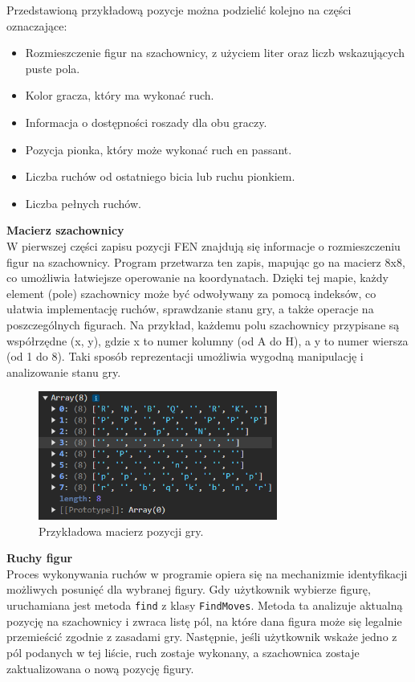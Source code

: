 \documentclass[twoside]{projektInzynierskiMS1}
\begin{document}
\newpage

\noindent
Przedstawioną przykładową pozycje można podzielić kolejno na części oznaczające:

\begin{itemize}
    \item Rozmieszczenie figur na szachownicy, z użyciem liter oraz liczb wskazujących puste pola.
    \item Kolor gracza, który ma wykonać ruch.
    \item Informacja o dostępności roszady dla obu graczy.
    \item Pozycja pionka, który może wykonać ruch en passant.
    \item Liczba ruchów od ostatniego bicia lub ruchu pionkiem.
    \item Liczba pełnych ruchów.
\end{itemize}

\noindent \textbf{Macierz szachownicy}\\
W pierwszej części zapisu pozycji FEN znajdują się informacje o rozmieszczeniu figur na szachownicy. Program przetwarza ten zapis, mapując go na macierz 8x8, co umożliwia łatwiejsze operowanie na koordynatach. Dzięki tej mapie, każdy element (pole) szachownicy może być odwoływany za pomocą indeksów, co ułatwia implementację ruchów, sprawdzanie stanu gry, a także operacje na poszczególnych figurach. Na przykład, każdemu polu szachownicy przypisane są współrzędne (x, y), gdzie x to numer kolumny (od A do H), a y to numer wiersza (od 1 do 8). Taki sposób reprezentacji umożliwia wygodną manipulację i analizowanie stanu gry.

\vspace{0.5cm}
\begin{figure}[h!]
    \centering
    \includegraphics[width=0.7\textwidth]{images/ex_matrix.png}
    \caption{Przykładowa macierz pozycji gry.}
\end{figure}

\newpage

\noindent \textbf{Ruchy figur}\\
Proces wykonywania ruchów w programie opiera się na mechanizmie identyfikacji możliwych posunięć dla wybranej figury. Gdy użytkownik wybierze figurę, uruchamiana jest metoda \texttt{find} z klasy \texttt{FindMoves}. Metoda ta analizuje aktualną pozycję na szachownicy i zwraca listę pól, na które dana figura może się legalnie przemieścić zgodnie z zasadami gry. Następnie, jeśli użytkownik wskaże jedno z pól podanych w tej liście, ruch zostaje wykonany, a szachownica zostaje zaktualizowana o nową pozycję figury. 
\end{document}
